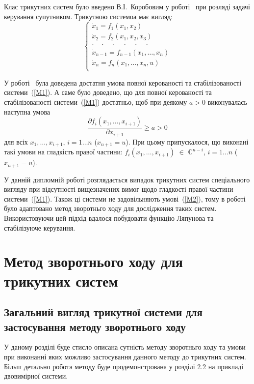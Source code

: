 \documentclass{article}
\begin{document}
Клас трикутних систем було введено В.І.~Коробовим у роботі~\cite{Korobov} при розляді задачі
керування супутником.
Трикутною системоа має вигляд: 
\begin{equation}\label{M1}
	\begin{cases}
        \dot x_1 = f_1(x_1, x_2)\\
        \dot x_2 = f_2(x_1, x_2 ,x_3)\\
        \cdot \quad \cdot \quad \cdot \quad \cdot \quad \cdot \quad \cdot \quad\\
        \dot x_{n-1} = f_{n-1}(x_1, \dots ,x_n)\\
        \dot x_{n} = f_{n}(x_1, \dots ,x_n,u)\\
	\end{cases}
\end{equation}

У роботі~\cite{Korobov} була доведена достатня умова повної керованості та стабілізованості
системи~(\ref{M1}). А саме було доведено, що для повної керованості та стабілізованості
системи~(\ref{M1}) достатньо, щоб при деякому $a>0$ виконувалась наступна
умова 
\begin{equation}\label{M2}
    \frac{\partial f_i(x_1,\dots,x_{i+1})}{\partial x_{i+1}} \geq a > 0 
\end{equation} 
для всіх $x_1, \dots, x_{i+1}$, $i=1 \dots n $ ($x_{n+1} = u$). При цьому 
припускалося, що виконані такі умови на гладкість правої частини: 
$ f_i(x_1,\dots,x_{i+1})$ $\in$ $\mathbb{C}^{n-i}$, $i=1 \dots n $ ($x_{n+1} = u$).

У данній дипломній роботі розглядається випадок трикутних систем спеціального вигляду при відсутності вищезначених вимог
щодо гладкості правої  частини системи~(\ref{M1}). 
Також ці системи не задовільняють умові~(\ref{M2}), тому в роботі було адаптовано метод 
зворотньго ходу для дослідження таких систем.  Використовуючи цей підхід вдалося 
побудовати функцію Ляпунова та стабілізуюче керування. 
\pagebreak

\section{Метод зворотнього ходу для трикутних систем}
\subsection{Загальний вигляд трикутної системи для застосування методу зворотнього ходу}
У даному розділі буде стисло описана сутність методу зворотньго ходу та умови  
при виконанні яких  можливо застосування данного методу до трикутних систем. Більш детально 
робота методу буде продемонстрована у розділі 2.2 на прикладі двовимірної системи.
\end{document}
